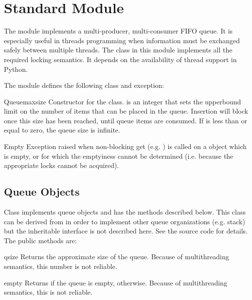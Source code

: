 \section{Standard Module }
\label{module-Queue}


The  module implements a multi-producer, multi-consumer
FIFO queue.  It is especially useful in threads programming when
information must be exchanged safely between multiple threads.  The
 class in this module implements all the required locking
semantics.  It depends on the availability of thread support in
Python.

The  module defines the following class and exception:


\begin{classdesc}{Queue}{maxsize}
Constructor for the class.   is an integer that sets the
upperbound limit on the number of items that can be placed in the
queue.  Insertion will block once this size has been reached, until
queue items are consumed.  If  is less than or equal to
zero, the queue size is infinite.
\end{classdesc}

\begin{excdesc}{Empty}
Exception raised when non-blocking get (e.g. ) is
called on a  object which is empty, or for which the
emptyiness cannot be determined (i.e. because the appropriate locks
cannot be acquired).
\end{excdesc}

\subsection{Queue Objects}
\label{QueueObjects}

Class  implements queue objects and has the methods
described below.  This class can be derived from in order to implement
other queue organizations (e.g. stack) but the inheritable interface
is not described here.  See the source code for details.  The public
methods are:


\begin{funcdesc}{qsize}{}
Returns the approximate size of the queue.  Because of multithreading
semantics, this number is not reliable.
\end{funcdesc}

\begin{funcdesc}{empty}{}
Returns  if the queue is empty,  otherwise.  Because
of multithreading semantics, this is not reliable.
\end{funcdesc}

